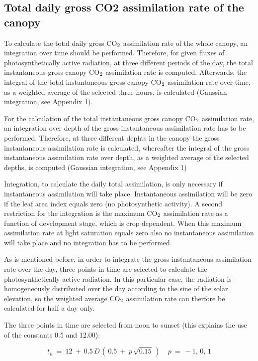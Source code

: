 \subsection{Total daily gross CO2 assimilation rate of the canopy  }

To calculate the total daily gross CO$_{{\rm 2}}$ assimilation rate of the whole canopy, an integra\-tion over time should be performed. Therefore, for given fluxes of photosyntheti\-cally
active radiation, at three different periods of the day, the total instantaneous gross canopy
CO$_{{\rm 2}}$ {\nobreak}assimila\-tion rate is computed. Afterwards, the integral of the total instantaneous
gross canopy CO$_{{\rm 2}}$ assimila\-tion rate over time, as a weighted average of the selected three
hours, is calculat\-ed (Gaussian integration, see Appendix 1).

For the calculation of the total instantaneous gross canopy CO$_{{\rm 2}}$ assimilation rate, an
integra\-tion over depth of the gross instantaneous assimilation rate has to be per\-formed.
Therefore, at three different dephts in the canopy the gross instanta\-neous assimilation rate
is calculated, whereafter the integral of the gross instantaneous assimila\-tion rate over
depth, as a weighted average of the selected depths, is computed (Gaussian integration,
see Appendix 1)

Integration, to calculate the daily total assimilation, is only necessary if instanta\-neous
assimilation will take place. Instanta\-neous assimila\-tion will be zero if the leaf area index
equals zero (no photosynthetic activity). A second restriction for the integration is the
maximum CO$_{{\rm 2}}$ assimilation rate as a function of development stage, which is crop
dependent. When this maxi\-mum assimila\-tion rate at light saturation equals zero also no
instantaneous assimila\-tion will take place and no integration has to be performed.

As is mentioned before, in order to integrate the gross instantaneous assimilation rate
over the day, three points in time are selected to calculate the photosynthetically active
radiation. In this particular case, the radiation is homogeneously distributed over the day
according to the sine of the solar elevation, so the weighted average CO$_{{\rm 2}}$ assimilation rate
can therfore be calculated for half a day only.

The three points in time are selected from noon to sunset (this explains the use of the
constants 0.5 and 12.00):

\begin{displaymath}
t _{h} ~=~ 12 ~+~ 0.5\, D\, (\, 0.5 ~+~ p\, \sqrt{0.15} \, )~~~~~p~=~-1,\, 0,\, 1
\end{displaymath}

